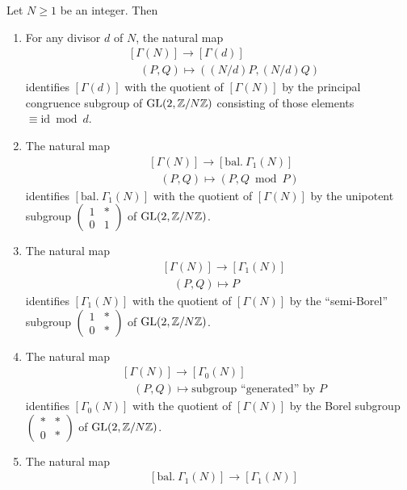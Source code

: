 \begin{kthm}\label{thm:7.4.2}
Let $N \ge 1$ be an integer. Then
\begin{enumerate}[(1)]
\item For any divisor $d$ of $N$, the natural map
\[
\begin{aligned}
& [\Gamma(N)] \to [\Gamma(d)] \\
& \quad (P, Q) \mapsto ((N/d)P, (N/d)Q)
\end{aligned}
\]
identifies $[\Gamma(d)]$ with the quotient of $[\Gamma(N)]$ by the principal congruence subgroup of $\operatorname{GL}(2,\mathbb{Z}/N\mathbb{Z})$ consisting of those elements $\equiv \mathrm{id} \bmod d$.
\item The natural map
\[
\begin{aligned}
& [\Gamma(N)] \to [\mathrm{bal.}\ \Gamma_1(N)] \\
& \quad (P, Q) \mapsto (P, Q \bmod P)
\end{aligned}
\]
identifies $[\mathrm{bal.}\ \Gamma_1(N)]$ with the quotient of $[\Gamma(N)]$ by the unipotent subgroup $\begin{pmatrix} 1 & * \\ 0 & 1 \end{pmatrix}$ of $\operatorname{GL}(2,\mathbb{Z}/N\mathbb{Z})$.
\item The natural map
\[
\begin{aligned}
& [\Gamma(N)] \to [\Gamma_1(N)] \\
& \quad (P, Q) \mapsto P
\end{aligned}
\]
identifies $[\Gamma_1(N)]$ with the quotient of $[\Gamma(N)]$ by the ``semi-Borel'' subgroup $\begin{pmatrix} 1 & * \\ 0 & * \end{pmatrix}$ of $\operatorname{GL}(2,\mathbb{Z}/N\mathbb{Z})$.
\item The natural map
\[
\begin{aligned}
& [\Gamma(N)] \to [\Gamma_0(N)] \\
& \quad (P, Q) \mapsto \text{subgroup ``generated'' by } P
\end{aligned}
\]
identifies $[\Gamma_0(N)]$ with the quotient of $[\Gamma(N)]$ by the Borel subgroup $\begin{pmatrix} * & * \\ 0 & * \end{pmatrix}$ of $\operatorname{GL}(2,\mathbb{Z}/N\mathbb{Z})$.
\item The natural map
\[
\begin{aligned}
& [\mathrm{bal.}\ \Gamma_1(N)] \to [\Gamma_1(N)] \\

\end{aligned}\]
\end{enumerate}
\end{kthm}
